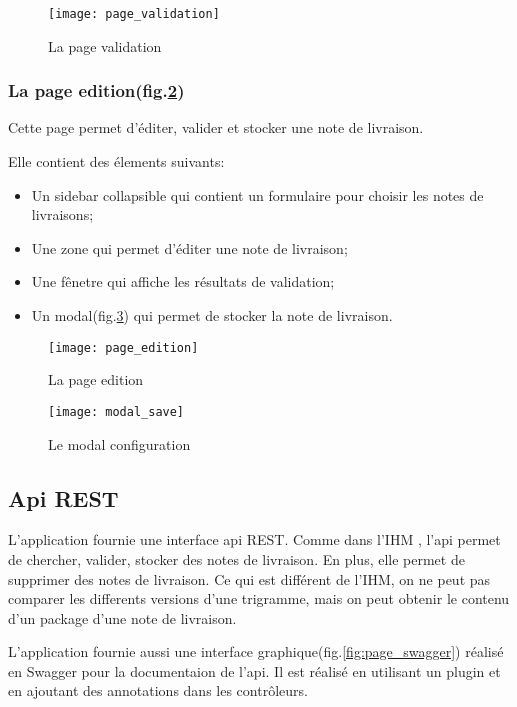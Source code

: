 \begin{figure}[ht]
 \centering
 \texttt{[image: page\_validation]}
 \caption{La page validation}
 \label{fig:page_validation}
\end{figure}

\subsubsection{La page edition(fig.\ref{fig:page_edition})}
Cette page permet d'éditer, valider et stocker une note de livraison.

Elle contient des élements suivants:
\begin{itemize}
 \item Un sidebar collapsible qui contient un formulaire pour choisir les notes de livraisons;
 \item Une zone qui permet d'éditer une note de livraison;
 \item Une fênetre qui affiche les résultats de validation;
 \item Un modal(fig.\ref{fig:modal_save}) qui permet de stocker la note de livraison.
\end{itemize}

\begin{figure}[ht]
 \centering
 \texttt{[image: page\_edition]}
 \caption{La page edition}
 \label{fig:page_edition}
\end{figure}

\begin{figure}[ht]
 \centering
 \texttt{[image: modal\_save]}
 \caption{Le modal configuration}
 \label{fig:modal_save}
\end{figure}

\clearpage

\subsection{Api REST}
L'application fournie une interface api REST.
Comme dans l'IHM , l'api permet de chercher, valider, stocker des notes de livraison.
En plus, elle permet de supprimer des notes de livraison.
Ce qui est différent de l'IHM, on ne peut pas comparer les differents versions d'une trigramme, mais on peut obtenir le contenu d'un package d'une note de livraison.

L'application fournie aussi une interface graphique(fig.\ref{fig:page_swagger}) réalisé en Swagger pour la documentaion de l'api.
Il est réalisé en utilisant un plugin et en ajoutant des annotations dans les contrôleurs.

